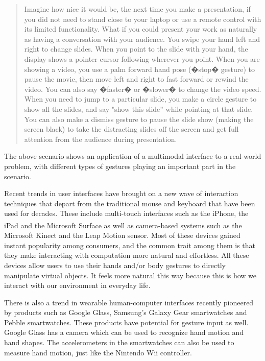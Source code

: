 \begin{quotation}
Imagine how nice it would be, the next time you make a presentation, if you did not need to stand close to your laptop or use a remote control with its limited functionality. What if you could present your work as naturally as having a conversation with your audience. You swipe your hand left and right to change slides. When you point to the slide with your hand, the display shows a pointer cursor following wherever you point. When you are showing a video, you use a palm forward hand pose (�stop� gesture) to pause the movie, then move left and right to fast forward or rewind the video. You can also say �faster� or �slower� to change the video speed. When you need to jump to a particular slide, you make a circle gesture to show all the slides, and say "show this slide'' while pointing at that slide. You can also make a dismiss gesture to pause the slide show (making the screen black) to take the distracting slides off the screen and get full attention from the audience during presentation.

\end{quotation}

The above scenario shows an application of a multimodal interface to a
real-world problem, with different types of gestures playing an important part
in the scenario.
 
Recent trends in user interfaces have brought on a new wave of interaction
techniques that depart from the traditional mouse and keyboard that have been 
used for decades. These include multi-touch interfaces such as the 
iPhone, the iPad and the Microsoft 
Surface\textsuperscript{\textregistered} as well as camera-based systems such as
the Microsoft Kinect and the Leap Motion sensor. Most
of these devices gained instant popularity among consumers, and the common trait
among them is that they make interacting with computation more natural and 
effortless. All these devices allow users to use their hands and/or body 
gestures to directly manipulate virtual objects. It feels more natural this 
way because this is how we interact with our environment in everyday life.
 
There is also a trend in wearable human-computer interfaces recently pioneered
by products such as Google Glass, Samsung's Galaxy Gear smartwatches and Pebble
smartwatches. These products have potential for gesture input as well. Google
Glass has a camera which can be used to recognize hand motion and hand shapes.
The accelerometers in the smartwatches can also be used to measure hand motion,
just like the Nintendo Wii controller.


